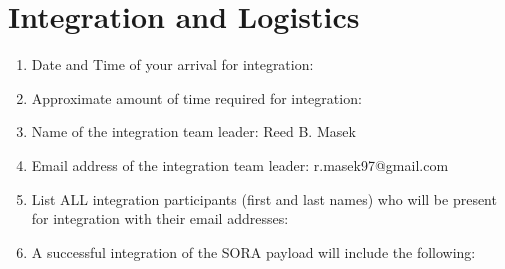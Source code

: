 \newpage
\section{Integration and Logistics}
\label{sec:Logistics}

\hspace*{0.5cm}
\begin{minipage}{\linewidth-0.5cm}
  \begin{enumerate}[label = \Alph*.]  
  \item Date and Time of your arrival for integration: %
  \item Approximate amount of time required for integration: %
  \item Name of the integration team leader: Reed B. Masek    
  \item Email address of the integration team leader: r.masek97@gmail.com
  \item List ALL integration participants (first and last names) who will be present for integration with their email addresses: \newline
  \item A successful integration of the SORA payload will include the following: \newline

\end{enumerate}
\end{minipage}
